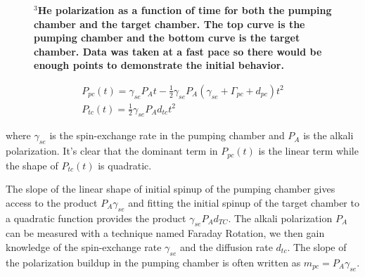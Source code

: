 \begin{figure}[H]
	\centering
	\caption{{\bf $^{3}$He polarization as a function of time for both the pumping chamber and the target chamber. The top curve is the pumping chamber and the bottom curve is the target chamber. Data was taken at a fast pace so there would be enough points to demonstrate the initial behavior. }}
	\label{BradySpinup}
\end{figure}

\begin{subequations}\label{InitialSpinup}
	\begin{gather}
	P_{pc}(t)=\gamma_{se}P_{A}t-\frac{1}{2}\gamma_{se}P_{A}(\gamma_{se}+\Gamma_{pc}+d_{pc})t^{2}\\
	P_{tc}(t)=\frac{1}{2}\gamma_{se}P_{A}d_{tc}t^{2}
	\end{gather}
\end{subequations}

where $\gamma_{se}$ is the spin-exchange rate in the pumping chamber and $P_{A}$ is the alkali polarization. It's clear that the dominant term in $P_{pc}(t)$ is the linear term while the shape of $P_{tc}(t)$ is quadratic. 

The slope of the linear shape of initial spinup of the pumping chamber gives access to the product $P_{A}\gamma_{se}$ and fitting the initial spinup of the target chamber to a quadratic function provides the product $\gamma_{se}P_{A}d_{TC}$. The alkali polarization $P_{A}$ can be measured with a technique named Faraday Rotation, we then gain knowledge of the spin-exchange rate $\gamma_{se}$ and the diffusion rate $d_{tc}$. The slope of the polarization buildup in the pumping chamber is often written as $m_{pc}=P_{A}\gamma_{se}$. 

